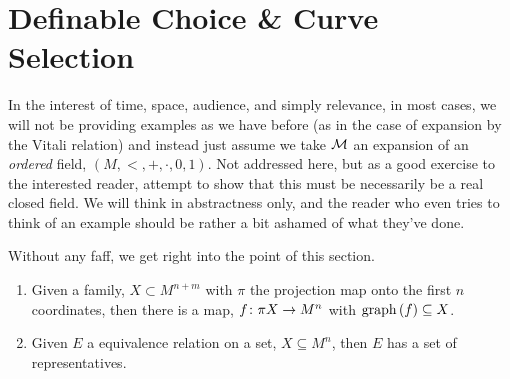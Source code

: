 \section{Definable Choice \& Curve Selection}
\noindent In the interest of time, space, audience, and simply relevance, in most cases, we will not be providing examples as we have before (as in the case of expansion by the Vitali relation) and instead just assume we take $\mathcal{M}$ an \om expansion of an \emph{ordered} field, $(M, <, +, \cdot, 0, 1)$. Not addressed here, but as a good exercise to the interested reader, attempt to show that this must be necessarily be a real closed field. We will think in abstractness only, and the reader who even tries to think of an example should be rather a bit ashamed of what they've done.

Without any faff, we get right into the point of this section.

\begin{proposition}
  \begin{enumerate}
    \item Given a  family, $X \subset M^{n+m}$ with $\pi$ the projection map onto the first $n$ coordinates, then there is a  map, $f \colon \pi X \to M^n$ with $\operatorname{graph}\left(f\right) \subseteq X$.
    \item Given $E$ a  equivalence relation on a  set, $X \subseteq M^n$, then $E$ has a set of representatives.
  \end{enumerate}

\end{proposition}
